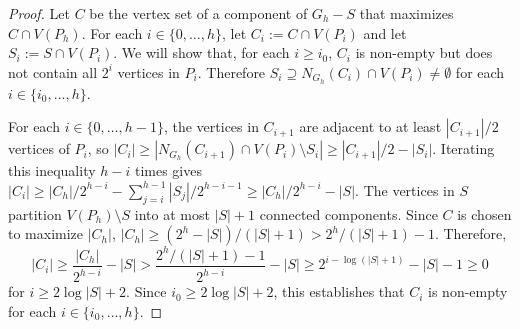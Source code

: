 \documentclass{patmorin}
\renewcommand{\ge}{\geqslant}
\begin{document}
\begin{proof}
  Let $C$ be the vertex set of a component of $G_h-S$ that maximizes $C\cap V(P_h)$. For each $i\in\{0,\ldots,h\}$, let $C_i:=C\cap V(P_i)$ and let $S_i:=S\cap V(P_i)$. We will show that, for each $i\ge i_0$, $C_i$ is non-empty but does not contain all $2^i$ vertices in $P_i$.  Therefore $S_i\supseteq N_{G_h}(C_i)\cap V(P_i)\neq\emptyset$ for each $i\in\{i_0,\ldots,h\}$.

  For each $i\in\{0,\ldots,h-1\}$, the vertices in $C_{i+1}$ are adjacent to at least $|C_{i+1}|/2$ vertices of $P_{i}$, so $|C_i|\ge |N_{G_h}(C_{i+1})\cap V(P_i)\setminus S_i| \ge |C_{i+1}|/2 - |S_i|$.  Iterating this inequality $h-i$ times gives $|C_i|\ge |C_h|/2^{h-i}-\sum_{j=i}^{h-1}|S_j|/2^{h-i-1}\ge |C_h|/2^{h-i}-|S|$.  The vertices in $S$ partition $V(P_h)\setminus S$ into at most $|S|+1$ connected components.  Since $C$ is chosen to maximize $|C_h|$, $|C_h| \ge (2^h-|S|)/(|S|+1) > 2^{h}/(|S|+1) - 1$.  Therefore,
  \begin{equation}
    |C_i|\ge \frac{|C_h|}{2^{h-i}} - |S| > \frac{2^h/(|S|+1)-1}{2^{h-i}} - |S|
    \ge 2^{i-\log(|S|+1)}-|S|-1 \ge 0
  \end{equation}
  for $i\ge 2\log |S|+2$.  Since $i_0\ge 2\log |S|+2$, this establishes that $C_i$ is non-empty for each $i\in\{i_0,\ldots,h\}$.


\end{proof}
\end{document}
